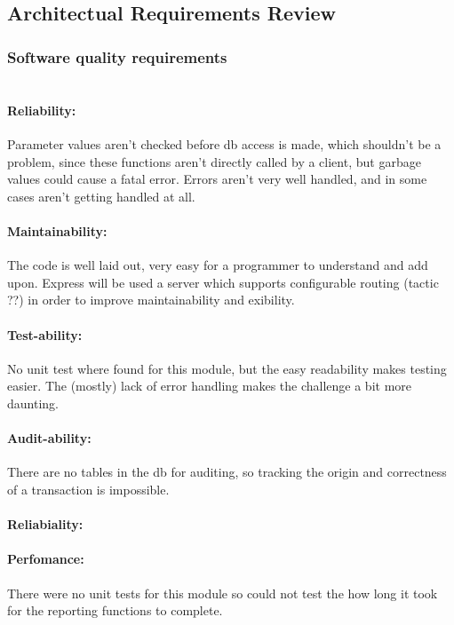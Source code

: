 \subsection{Architectual Requirements Review}

\subsubsection{Software quality requirements} 

\paragraph{\\Reliability:}
Parameter values aren't checked before db access is made, which shouldn't be a problem, since these functions aren't directly called by a client, but garbage values could cause a fatal error. Errors aren't very well handled, and in some cases aren't getting handled at all.
\par
\paragraph{Maintainability:}
The code is well laid out, very easy for a programmer to understand and add upon.
Express will be used a server which supports configurable
routing (tactic ??) in order to improve maintainability and 
exibility.
\par
\paragraph{Test-ability:}
 No unit test where found for this module, but the easy readability makes testing easier. The (mostly) lack of error handling makes the challenge a bit more daunting.
\par
\paragraph {Audit-ability:}
There are no tables in the db for auditing, so tracking the origin and correctness of a transaction is impossible.
\\
\par
\paragraph{Reliabiality:}
\par
\paragraph{Perfomance:}
There were no unit tests for this module so could not test the how long it took for the reporting functions to complete.
\par
